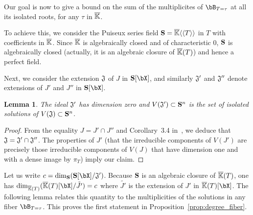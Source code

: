 \documentclass[12pt]{article}
\newtheorem{lemma}[definition]{Lemma}
\begin{document}
Our goal is now to give a bound on the sum of the multiplicites of
$\bB_{T=\tau}$ at all its isolated roots, for any $\tau$ in $\overline{\mathbb{K}}$.

To achieve this, we consider the Puiseux series field
$\mathbf{S} = \overline{\mathbb{K}}\langle \langle T\rangle \rangle$ in $T$ with
coefficients in $\overline{\mathbb{K}}$.  Since $\overline{\mathbb{K}}$ is algebraically closed and
of characteristic $0$, $\mathbf{S}$ is algebraically closed (actually, it is
an algebraic closure of $\overline{\mathbb{K}}(T)$) and hence a perfect field.

Next, we consider the extension $\frak{J}$ of $J$ in $\SS[\bX]$, and
similarly $\frak{J}'$ and ${\frak J}''$ denote extensions of $J'$ and
$J''$ in $\SS[\bX]$.

\begin{lemma}\label{lemma:dimJprime}
  The ideal $\frak{J}'$ has dimension zero and $V(\frak{J}') \subset
  \mathbf{S}^n$ is the set of isolated solutions of
  $V(\frak{J}) \subset \mathbf{S}^n$.
\end{lemma}
\begin{proof}
 From the equality $J=J' \cap J''$ and Corollary~3.4 in~\cite{AtMc},
 we deduce that $\frak{J}=\frak{J'} \cap \frak{J''}$. The properties
 of $J'$ (that the irreducible components of $V(J')$ are precisely those
 irreducible components of $V(J)$ that have dimension one and with a
 dense image by $\pi_T$) imply our claim.
\end{proof}


Let us write $c=\dim_{\SS}(\SS[\bX]/{\frak J}')$. Because $\mathbf{S}$ is an
algebraic closure of $\overline{\mathbb{K}}(T)$, one has $\dim_{\KKbar(T)} (
\KKbar(T)[\bX]/\tilde{J'} ) = c$ where $\tilde{J'}$ is the extension
of $J'$ in $\KKbar(T)[\bX]$. The following lemma relates this
quantity to the multiplicities of the solutions in any fiber
$\bB_{T=\tau}$. This proves the first statement in
Proposition~\ref{prop:degree_fiber}.
\end{document}
